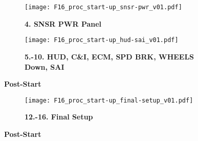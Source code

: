 \begin{figure}[h]
    \centering
    \begin{subfigure}[t]{0.40\linewidth}
        \centering
        \texttt{[image: F16\_proc\_start-up\_snsr-pwr\_v01.pdf]}
        \caption*{\textbf{4. SNSR PWR Panel}}
    \end{subfigure}
    \begin{subfigure}[t]{0.55\linewidth}
        \centering
        \texttt{[image: F16\_proc\_start-up\_hud-sai\_v01.pdf]}
        \caption*{\textbf{5.-10. HUD, C\&I, ECM, SPD BRK, WHEELS Down, SAI}}
    \end{subfigure}
    \caption{\textbf{Post-Start}}
    \label{fig:proc:poststart2}
\end{figure}

\clearpage

\begin{tcolorenumerate}[resume]
\end{tcolorenumerate}

\begin{figure}[h]
    \centering
    \begin{subfigure}[t]{0.45\linewidth}
        \centering
        \texttt{[image: F16\_proc\_start-up\_final-setup\_v01.pdf]}
        \caption*{\textbf{12.-16. Final Setup}}
    \end{subfigure}
    \caption{\textbf{Post-Start}}
    \label{fig:proc:poststart2}
\end{figure}



